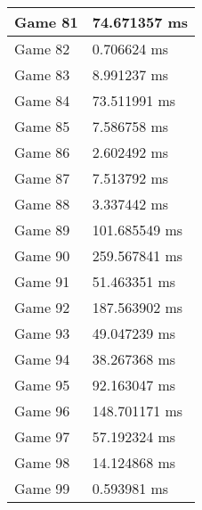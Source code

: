\begin{tabular}{|l|l|}
	Game 81 & 74.671357 ms \\ \hline
	Game 82 & 0.706624 ms \\ \hline
	Game 83 & 8.991237 ms \\ \hline
	Game 84 & 73.511991 ms \\ \hline
	Game 85 & 7.586758 ms \\ \hline
	Game 86 & 2.602492 ms \\ \hline
	Game 87 & 7.513792 ms \\ \hline
	Game 88 & 3.337442 ms \\ \hline
	Game 89 & 101.685549 ms \\ \hline
	Game 90 & 259.567841 ms \\ \hline
	Game 91 & 51.463351 ms \\ \hline
	Game 92 & 187.563902 ms \\ \hline
	Game 93 & 49.047239 ms \\ \hline
	Game 94 & 38.267368 ms \\ \hline
	Game 95 & 92.163047 ms \\ \hline
	Game 96 & 148.701171 ms \\ \hline
	Game 97 & 57.192324 ms \\ \hline
	Game 98 & 14.124868 ms \\ \hline
	Game 99 & 0.593981 ms \\ \hline
\end{tabular}

